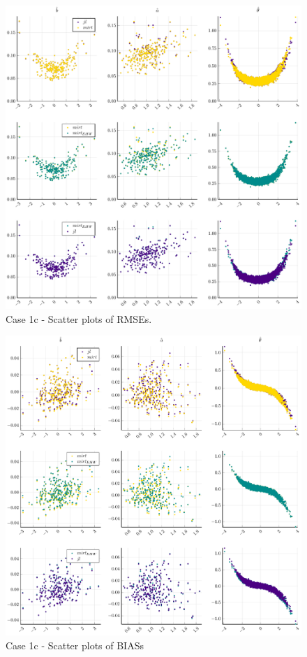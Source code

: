 \begin{figure}[ht]
	\centering
	\includegraphics[width=\textwidth]{Figures/1c/RMSEscatter.pdf}
	\caption{Case 1c - Scatter plots of RMSEs.}
	\label{fig:spRMSE1c}
\end{figure}
\begin{figure}[ht]
	\centering
	\includegraphics[width=\textwidth]{Figures/1c/BIASscatter.pdf}
	\caption{Case 1c - Scatter plots of BIASs }
	\label{fig:spBIAS1c}
\end{figure}
